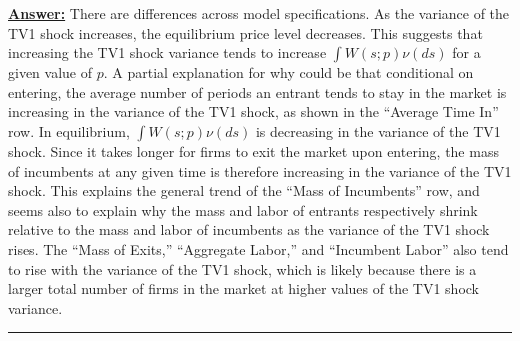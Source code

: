 \documentclass{article} %
\theoremstyle{definition}
\newenvironment{solution}[1][Answer]{\begin{singlespace}\underline{\textbf{#1:}}\quad }{\ \rule{0.3em}{0.3em}\end{singlespace}} %
\begin{document}
\begin{solution}
	There are differences across model specifications. As the variance of the TV1 shock increases, the equilibrium price level decreases. This suggests that increasing the TV1 shock variance tends to increase $\int W(s;p)\nu(ds)$ for a given value of $p$. A partial explanation for why could be that conditional on entering, the average number of periods an entrant tends to stay in the market is increasing in the variance of the TV1 shock, as shown in the ``Average Time In'' row. In equilibrium, $\int W(s;p)\nu(ds)$ is decreasing in the variance of the TV1 shock. Since it takes longer for firms to exit the market upon entering, the mass of incumbents at any given time is therefore increasing in the variance of the TV1 shock. This explains the general trend of the ``Mass of Incumbents'' row, and seems also to explain why the mass and labor of entrants respectively shrink relative to the mass and labor of incumbents as the variance of the TV1 shock rises. The ``Mass of Exits,'' ``Aggregate Labor,'' and ``Incumbent Labor'' also tend to rise with the variance of the TV1 shock, which is likely because there is a larger total number of firms in the market at higher values of the TV1 shock variance.
\end{solution}
\end{document}
